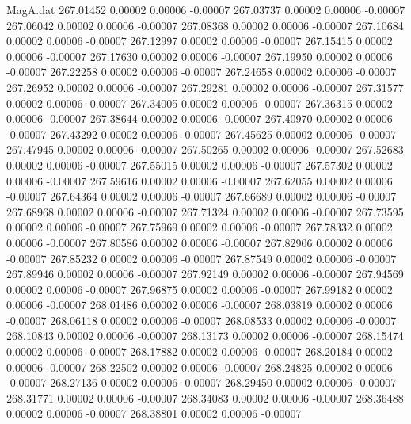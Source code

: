 \begin{filecontents}{MagA.dat}
 267.01452    0.00002    0.00006   -0.00007
 267.03737    0.00002    0.00006   -0.00007
 267.06042    0.00002    0.00006   -0.00007
 267.08368    0.00002    0.00006   -0.00007
 267.10684    0.00002    0.00006   -0.00007
 267.12997    0.00002    0.00006   -0.00007
 267.15415    0.00002    0.00006   -0.00007
 267.17630    0.00002    0.00006   -0.00007
 267.19950    0.00002    0.00006   -0.00007
 267.22258    0.00002    0.00006   -0.00007
 267.24658    0.00002    0.00006   -0.00007
 267.26952    0.00002    0.00006   -0.00007
 267.29281    0.00002    0.00006   -0.00007
 267.31577    0.00002    0.00006   -0.00007
 267.34005    0.00002    0.00006   -0.00007
 267.36315    0.00002    0.00006   -0.00007
 267.38644    0.00002    0.00006   -0.00007
 267.40970    0.00002    0.00006   -0.00007
 267.43292    0.00002    0.00006   -0.00007
 267.45625    0.00002    0.00006   -0.00007
 267.47945    0.00002    0.00006   -0.00007
 267.50265    0.00002    0.00006   -0.00007
 267.52683    0.00002    0.00006   -0.00007
 267.55015    0.00002    0.00006   -0.00007
 267.57302    0.00002    0.00006   -0.00007
 267.59616    0.00002    0.00006   -0.00007
 267.62055    0.00002    0.00006   -0.00007
 267.64364    0.00002    0.00006   -0.00007
 267.66689    0.00002    0.00006   -0.00007
 267.68968    0.00002    0.00006   -0.00007
 267.71324    0.00002    0.00006   -0.00007
 267.73595    0.00002    0.00006   -0.00007
 267.75969    0.00002    0.00006   -0.00007
 267.78332    0.00002    0.00006   -0.00007
 267.80586    0.00002    0.00006   -0.00007
 267.82906    0.00002    0.00006   -0.00007
 267.85232    0.00002    0.00006   -0.00007
 267.87549    0.00002    0.00006   -0.00007
 267.89946    0.00002    0.00006   -0.00007
 267.92149    0.00002    0.00006   -0.00007
 267.94569    0.00002    0.00006   -0.00007
 267.96875    0.00002    0.00006   -0.00007
 267.99182    0.00002    0.00006   -0.00007
 268.01486    0.00002    0.00006   -0.00007
 268.03819    0.00002    0.00006   -0.00007
 268.06118    0.00002    0.00006   -0.00007
 268.08533    0.00002    0.00006   -0.00007
 268.10843    0.00002    0.00006   -0.00007
 268.13173    0.00002    0.00006   -0.00007
 268.15474    0.00002    0.00006   -0.00007
 268.17882    0.00002    0.00006   -0.00007
 268.20184    0.00002    0.00006   -0.00007
 268.22502    0.00002    0.00006   -0.00007
 268.24825    0.00002    0.00006   -0.00007
 268.27136    0.00002    0.00006   -0.00007
 268.29450    0.00002    0.00006   -0.00007
 268.31771    0.00002    0.00006   -0.00007
 268.34083    0.00002    0.00006   -0.00007
 268.36488    0.00002    0.00006   -0.00007
 268.38801    0.00002    0.00006   -0.00007

\end{filecontents}
